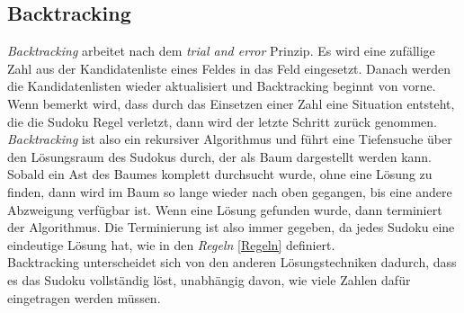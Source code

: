 \newpage
\subsection{Backtracking}
\label{Backtracking}
\textit{Backtracking} arbeitet nach dem \textit{trial and error} Prinzip. Es wird eine zufällige Zahl aus der Kandidatenliste eines Feldes in das Feld eingesetzt. Danach werden die Kandidatenlisten wieder aktualisiert und Backtracking beginnt von vorne. Wenn bemerkt wird, dass durch das Einsetzen einer Zahl eine Situation entsteht, die die Sudoku Regel verletzt, dann wird der letzte Schritt zurück genommen. \textit{Backtracking} ist also ein rekursiver Algorithmus und führt eine Tiefensuche über den Lösungsraum des Sudokus durch, der als Baum dargestellt werden kann. Sobald ein Ast des Baumes komplett durchsucht wurde, ohne eine Lösung zu finden, dann wird im Baum so lange wieder nach oben gegangen, bis eine andere Abzweigung verfügbar ist. Wenn eine Lösung gefunden wurde, dann terminiert der Algorithmus. Die Terminierung ist also immer gegeben, da jedes Sudoku eine eindeutige Lösung hat, wie in den \textit{Regeln} \ref{Regeln} definiert.\\
Backtracking unterscheidet sich von den anderen Lösungstechniken dadurch, dass es das Sudoku vollständig löst, unabhängig davon, wie viele Zahlen dafür eingetragen werden müssen.